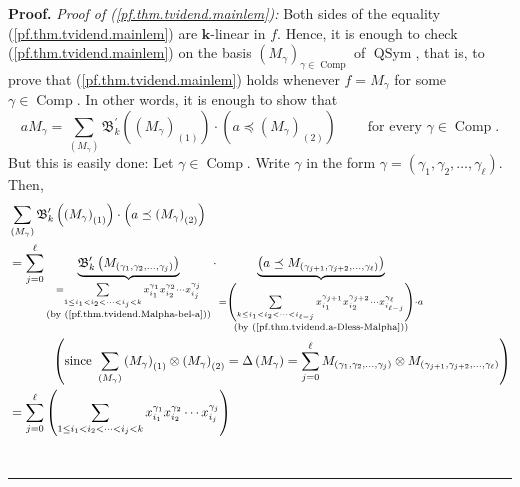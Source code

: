 \documentclass
[numbers=enddot,12pt,final,onecolumn,notitlepage,abstracton]{scrartcl}%
\theoremstyle{definition}
\newenvironment{proof}[1][Proof]{\noindent\textbf{#1.} }{\ \rule{0.5em}{0.5em}}
\newenvironment{verlong}{}{}
\let\sumnonlimits\sum
\renewcommand{\sum}{\sumnonlimits\limits}
\begin{document}
\begin{verlong}
\begin{proof}
\textit{Proof of (\ref{pf.thm.tvidend.mainlem}):} Both sides of the equality
(\ref{pf.thm.tvidend.mainlem}) are $\mathbf{k}$-linear in $f$. Hence, it is
enough to check (\ref{pf.thm.tvidend.mainlem}) on the basis $\left(
M_{\gamma}\right)  _{\gamma\in\operatorname*{Comp}}$ of $\operatorname*{QSym}%
$, that is, to prove that (\ref{pf.thm.tvidend.mainlem}) holds whenever
$f=M_{\gamma}$ for some $\gamma\in\operatorname*{Comp}$. In other words, it is
enough to show that
\[
aM_{\gamma}=\sum_{\left(  M_{\gamma}\right)  }\mathfrak{B}_{k}^{\prime}\left(
\left(  M_{\gamma}\right)  _{\left(  1\right)  }\right)  \cdot\left(  a\left.
\preceq\right.  \left(  M_{\gamma}\right)  _{\left(  2\right)  }\right)
\ \ \ \ \ \ \ \ \ \ \text{for every }\gamma\in\operatorname*{Comp}.
\]
But this is easily done: Let $\gamma\in\operatorname*{Comp}$. Write $\gamma$
in the form $\gamma=\left(  \gamma_{1},\gamma_{2},\ldots,\gamma_{\ell}\right)
$. Then,%
\begin{align*}
&  \sum_{\left(  M_{\gamma}\right)  }\mathfrak{B}_{k}^{\prime}\left(  \left(
M_{\gamma}\right)  _{\left(  1\right)  }\right)  \cdot\left(  a\left.
\preceq\right.  \left(  M_{\gamma}\right)  _{\left(  2\right)  }\right) \\
&  =\sum_{j=0}^{\ell}\underbrace{\mathfrak{B}_{k}^{\prime}\left(  M_{\left(
\gamma_{1},\gamma_{2},\ldots,\gamma_{j}\right)  }\right)  }_{\substack{=\sum
_{1\leq i_{1}<i_{2}<\cdots<i_{j}<k}x_{i_{1}}^{\gamma_{1}}x_{i_{2}}^{\gamma
_{2}}\cdots x_{i_{j}}^{\gamma_{j}}\\\text{(by
(\ref{pf.thm.tvidend.Malpha-bel-a}))}}}\cdot\underbrace{\left(  a\left.
\preceq\right.  M_{\left(  \gamma_{j+1},\gamma_{j+2},\ldots,\gamma_{\ell
}\right)  }\right)  }_{\substack{=\left(  \sum_{k\leq i_{1}<i_{2}%
<\cdots<i_{\ell-j}}x_{i_{1}}^{\gamma_{j+1}}x_{i_{2}}^{\gamma_{j+2}}\cdots
x_{i_{\ell-j}}^{\gamma_{\ell}}\right)  \cdot a\\\text{(by
(\ref{pf.thm.tvidend.a-Dless-Malpha}))}}}\\
&  \ \ \ \ \ \ \ \ \ \ \left(  \text{since }\sum_{\left(  M_{\gamma}\right)
}\left(  M_{\gamma}\right)  _{\left(  1\right)  }\otimes\left(  M_{\gamma
}\right)  _{\left(  2\right)  }=\Delta\left(  M_{\gamma}\right)  =\sum
_{j=0}^{\ell}M_{\left(  \gamma_{1},\gamma_{2},\ldots,\gamma_{j}\right)
}\otimes M_{\left(  \gamma_{j+1},\gamma_{j+2},\ldots,\gamma_{\ell}\right)
}\right) \\
&  =\sum_{j=0}^{\ell}\left(  \sum_{1\leq i_{1}<i_{2}<\cdots<i_{j}<k}x_{i_{1}%
}^{\gamma_{1}}x_{i_{2}}^{\gamma_{2}}\cdots x_{i_{j}}^{\gamma_{j}}\right)

\end{align*}
\end{proof}
\end{verlong}
\end{document}
